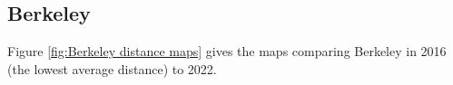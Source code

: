 \documentclass[11pt]{article}
\theoremstyle{remark}
\theoremstyle{definition}
\begin{document}

\subsection{Berkeley}
Figure \ref{fig:Berkeley distance maps} gives the maps comparing Berkeley in 2016 (the lowest average distance) to 2022.
\end{document}
